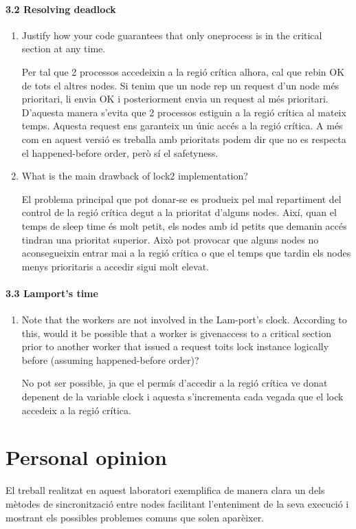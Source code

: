 \documentclass[a4paper, 10pt]{article}
\begin{document}
\paragraph[bold]{3.2 Resolving deadlock}
\begin{enumerate}
\item Justify how your code guarantees that only oneprocess is in the critical section at any time.
\begin{flushleft}
Per tal que 2 processos accedeixin a la regió crítica alhora, cal que rebin OK de tots el altres nodes. Si tenim
que un node rep un request d'un node més prioritari, li envia OK i posteriorment envia un request al més prioritari.
D'aquesta manera s'evita que 2 processos estiguin a la regió crítica al mateix temps. Aquesta request  ens garanteix un únic accés a la regió crítica.
A més com en aquest versió es treballa amb prioritats podem dir que no es respecta el happened-before order, però sí el safetyness.

\end{flushleft}

\item What is the main drawback of lock2 implementation?
\begin{flushleft}
El problema principal que pot donar-se es produeix pel mal repartiment del control de la regió
crítica degut a la prioritat d'alguns nodes. Així, quan el temps de sleep time és molt petit,
els nodes amb id petits que demanin accés tindran una prioritat superior. Això pot provocar que alguns
nodes no aconsegueixin entrar mai a la regió crítica o que el temps que tardin els nodes menys prioritaris a accedir
sigui molt elevat.

\end{flushleft}


\end{enumerate}

\paragraph[bold]{3.3 Lamport's time}
\begin{enumerate}
\item Note that the workers are not involved in the Lam-port’s clock.  According to this, would it be possible that a worker is givenaccess to a critical section prior to another worker that issued a request toits lock instance logically before (assuming happened-before order)?
\begin{flushleft}
No pot ser possible, ja que el permís d'accedir a la regió crítica ve donat depenent de la variable clock i aquesta s'incrementa
cada vegada que el lock accedeix a la regió crítica.

\end{flushleft}

\end{enumerate}

\newpage
\section{Personal opinion}
\begin{flushleft}
El treball realitzat en aquest laboratori exemplifica de manera clara un dels mètodes de sincronització entre nodes
facilitant l'enteniment de la seva execució i mostrant els possibles problemes comuns que solen aparèixer.

\end{flushleft}
\end{document}

